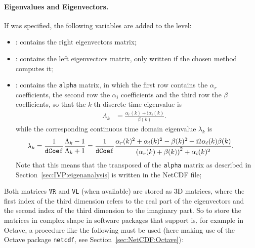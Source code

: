 \paragraph{Eigenvalues and Eigenvectors.}
If  was specified, the following variables are added to the
 level:
\begin{itemize}
\item {} : contains the right eigenvectors matrix;
\item {} : contains the left eigenvectors matrix, only
  written if the chosen method computes it;
\item {} : contains the \texttt{alpha} matrix, in which
  the first row contains the $\alpha_r$ coefficients, the second row the $\alpha_i$
  coefficients and the third row the $\beta$ coefficients, so that the $k$-th
  discrete time eigenvalue is
    \begin{align}
	\Lambda_k
	&=
	\frac{\alpha_r(k) + \text{i} \alpha_i(k)}{\beta(k)}
	.
    \end{align}
    while the corresponding continuous time domain eigenvalue $\lambda_k$ is
    \begin{align}
        \lambda_k
	&=
	\frac{1}{\texttt{dCoef}}
	\frac{\Lambda_k - 1}{\Lambda_k + 1}
	=
	\frac{1}{\texttt{dCoef}}
	\frac{
		\alpha_r(k)^2
		+
		\alpha_i(k)^2
		-
		\beta(k)^2
		+
		\text{i} 2 \alpha_i(k) \beta(k)
	}{
		\left( \alpha_r(k) + \beta(k) \right)^2 + \alpha_i(k)^2
	}
	.
    \end{align}
    Note that this means that the transposed of the \texttt{alpha} matrix as
    described in Section~\ref{sec:IVP:eigenanalysis} is written in the NetCDF file;
\end{itemize}
Both matrices $\texttt{VR}$ and \texttt{VL} (when available) are stored as 3D
matrices, where the first index of the third dimension refers to the real part of the
eigenvectors and the second index of the third dimension to the imaginary part. So to
store the matrices in complex shape in software packages that support is, for example
in Octave, a procedure like the following must be used (here making use of the Octave
package \texttt{netcdf}, see 
Section~\ref{sec:NetCDF:Octave}):
